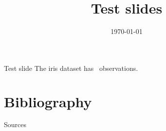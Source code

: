 \documentclass[table,british,aspectratio=169]{beamer}
\title{Test slides}
\subtitle{}
\author{}
\institute{}
\date{\today}
\begin{document}
\begin{frame}
    \titlepage
\end{frame}


\begin{frame}{Test slide}
  The iris dataset has \irisobs~observations.
\end{frame}


\appendix
\begingroup

\section{Bibliography}
\begin{frame}[allowframebreaks]{Sources}
  \printbibliography[heading=none]
\end{frame}
\end{document}
